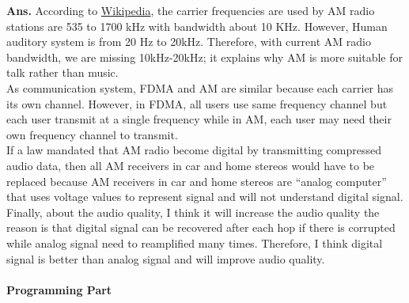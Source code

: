 \documentclass[12pt]{article}
\newenvironment{problem}[2][Problem]{\begin{trivlist}
\item[\hskip \labelsep {\bfseries #1}\hskip \labelsep {\bfseries #2.}]}{\end{trivlist}}
\begin{document}
\begin{problem}{3}
\end{problem}
\textbf{Ans.} According to \href{https://en.wikipedia.org/wiki/Broadcast_band}{Wikipedia}, the carrier frequencies are used by AM radio stations are 535 to 1700 kHz with bandwidth about 10 KHz. However, Human auditory system is from 20 Hz to 20kHz. Therefore, with current AM radio bandwidth, we are missing 10kHz-20kHz; it explains why AM is more suitable for talk rather than music. \\
As communication system, FDMA and AM are similar because each carrier has its own channel. However, in FDMA, all users use same frequency channel but each user transmit at a single frequency while in AM, each user may need their own frequency channel to transmit. \\
If a  law  mandated  that  AM  radio  become  digital  by  transmitting compressed  audio  data, then all AM receivers in car and home stereos would have to be replaced because AM receivers in car and home stereos are ``analog computer'' that uses voltage values to represent signal and will not understand digital signal. \\ Finally, about the audio quality, I think it will increase the audio quality the reason is that digital signal can be recovered after each hop if there is corrupted while analog signal need to reamplified many times. Therefore, I think digital signal is better than analog signal and will improve audio quality.\\\\
\Large{\textbf{Programming Part}}
\normalsize
\begin{problem}{Bonus}
	
\end{problem}
\end{document}
